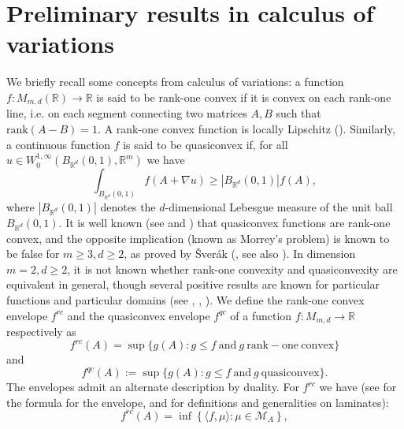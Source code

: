 \documentclass[11pt, a4paper, reqno]{elsarticle}
\theoremstyle{definition}
\theoremstyle{remark}
\begin{document}
\section{Preliminary results in calculus of variations}\label{sec : calcvar}
We briefly recall some concepts from
calculus of variations:
a function
$f\colon M_{m,d}(\mathbb{R})\to \mathbb{R}$ is said
to be rank-one convex if it is 
convex on each 
rank-one line, i.e. on each 
segment connecting two matrices $A,B$
such that
$\mathrm{rank}(A-B)=1$. A 
rank-one convex function 
is locally
Lipschitz (\cite[lemma 5.6]{Rindler}).
Similarly, a continuous 
function $f$
is said to be quasiconvex if, for all
$u\in W^{1,\infty}_0(B_{\mathbb{R}^d}(0,1),\mathbb{R}^m)$
we have
\begin{equation*}
    \int_{B_{\mathbb{R}^d}(0,1)} f(A+\nabla u)\ge |B_{\mathbb{R}^d}(0,1)| f(A),
\end{equation*}
where $|B_{\mathbb R^d}(0,1)|$ denotes the $d$-dimensional Lebesgue
measure of the unit ball $B_{\mathbb{R}^d}(0,1)$.
It is well known (see \cite[Proposition 5.3]{Rindler} and \cite[Lemma 4.3]{Muller1999VariationalTransitions})
that quasiconvex functions are rank-one convex, and the opposite implication (known
as Morrey's problem) is known to be false for $m\ge 3, d\ge 2$, as proved by Šverák (\cite{Sverak1992Rank-oneQuasiconvexity}, see also \cite{Grabovsky2017}). In dimension $m=2, d\ge 2$, it is not known whether rank-one convexity 
and quasiconvexity are equivalent in general, though several positive results are known for 
particular functions and particular domains (see \cite{Harris2018}, \cite{Faraco2008}, \cite{Muller1999Rank-oneMatrices}).
We define the
rank-one convex envelope $f^{rc}$ and the quasiconvex envelope $f^{qc}$ 
of a function $f\colon M_{m,d}\to \mathbb{R}$ respectively
as
\begin{equation*}
    f^{rc}(A)=\sup\{g(A)\colon  g\le f\ \mathrm{and}\ g\ \mathrm{ rank-one \ convex}\}
\end{equation*}
and
\begin{equation*}
    f^{qc}(A):=\sup\{g(A)\colon  g\le f\ \mathrm{and}\ g\ \mathrm{ quasiconvex}\}.
\end{equation*}
The envelopes admit an alternate description by duality. For $f^{rc}$ we have 
(see 
\cite[Theorem 6.10]{Dacorogna2008DirectVariations}
for the formula for the envelope,
\cite{Pedregal1993LaminatesMicrostructure} and \cite[Section 9.1]{Rindler} for
definitions and generalities on
laminates):
\begin{equation}\label{eq : rcenv}
    f^{rc}(A)=\inf \left\{\langle f,\mu\rangle\colon  \mu\in\mathcal M_A\right\},
\end{equation}
\end{document}
